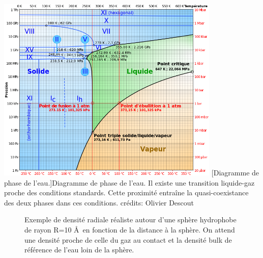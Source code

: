 \begin{center}
    \captionsetup{type=figure}
	\includegraphics[width=0.8\textwidth]{chapters/bridge/images/diagramme_phase_eau.png}
	[Diagramme de phase de l'eau.]{Diagramme de phase de l'eau. Il existe une transition liquide-gaz proche des conditions standards. Cette proximité entraîne la quasi-coexistance des deux phases dans ces conditions. crédits: Olivier Descout}
    \label{fig:diagramme_phase_eau}
\end{center}




\begin{figure}[ht]
    \center    
    \caption[Représentation du démouillage autour d'une sphère hydrophobe.]{Exemple de densité radiale réaliste autour d'une sphère hydrophobe de rayon R=10 \AA\ en fonction de la distance à la sphère. On attend une densité proche de celle du gaz au contact et la densité bulk de référence de l'eau loin de la sphère.}
    \label{fig:demouillage}
\end{figure}



